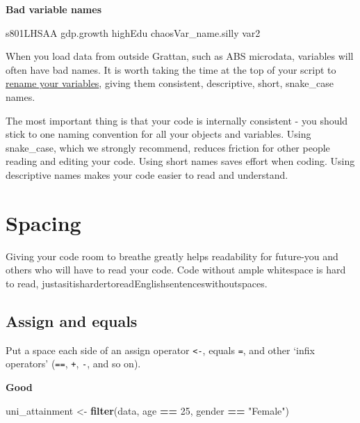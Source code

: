 \documentclass[]{book}
\newenvironment{Shaded}{\begin{snugshade}}{\end{snugshade}}
\newcommand{\DecValTok}[1]{\textcolor[rgb]{0.00,0.00,0.81}{#1}}
\newcommand{\KeywordTok}[1]{\textcolor[rgb]{0.13,0.29,0.53}{\textbf{#1}}}
\newcommand{\NormalTok}[1]{#1}
\newcommand{\OperatorTok}[1]{\textcolor[rgb]{0.81,0.36,0.00}{\textbf{#1}}}
\newcommand{\StringTok}[1]{\textcolor[rgb]{0.31,0.60,0.02}{#1}}
\begin{document}
\textbf{Bad variable names}

\begin{Shaded}
\begin{Highlighting}[]
\NormalTok{s801LHSAA}
\NormalTok{gdp.growth}
\NormalTok{highEdu}
\NormalTok{chaosVar_name.silly}
\NormalTok{var2}
\end{Highlighting}
\end{Shaded}

When you load data from outside Grattan, such as ABS microdata, variables will often have bad names. It is worth taking the time at the top of your script to \href{https://dplyr.tidyverse.org/reference/select.html}{rename your variables}, giving them consistent, descriptive, short, snake\_case names.

The most important thing is that your code is internally consistent - you should stick to one naming convention for all your objects and variables. Using snake\_case, which we strongly recommend, reduces friction for other people reading and editing your code. Using short names saves effort when coding. Using descriptive names makes your code easier to read and understand.

\hypertarget{spacing}{%
\section{Spacing}\label{spacing}}

Giving your code room to breathe greatly helps readability for future-you and others who will have to read your code. Code without ample whitespace is hard to read, justasitishardertoreadEnglishsentenceswithoutspaces.

\hypertarget{assign-and-equals}{%
\subsection{Assign and equals}\label{assign-and-equals}}

Put a space each side of an assign operator \texttt{\textless{}-}, equals \texttt{=}, and other `infix operators' (\texttt{==}, \texttt{+}, \texttt{-}, and so on).

\textbf{Good}

\begin{Shaded}
\begin{Highlighting}[]
\NormalTok{uni_attainment <-}\StringTok{ }\KeywordTok{filter}\NormalTok{(data, age }\OperatorTok{==}\StringTok{ }\DecValTok{25}\NormalTok{, gender }\OperatorTok{==}\StringTok{ "Female"}\NormalTok{)}
\end{Highlighting}
\end{Shaded}
\end{document}

